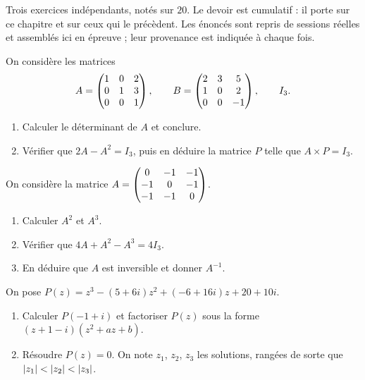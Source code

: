 \begin{devoir}[2 heures]
Trois exercices indépendants, notés sur $20$. Le devoir est cumulatif : il porte sur ce chapitre et sur ceux qui le précèdent. Les énoncés sont repris de sessions réelles et assemblés ici en épreuve ; leur provenance est indiquée à chaque fois.

On considère les matrices
\[
  A = \begin{pmatrix} 1 & 0 & 2 \\ 0 & 1 & 3 \\ 0 & 0 & 1 \end{pmatrix}, \qquad
  B = \begin{pmatrix} 2 & 3 & 5 \\ 1 & 0 & 2 \\ 0 & 0 & -1 \end{pmatrix}, \qquad I_{3}.
\]
\begin{enumerate}[label=\textbf{\arabic*)}, leftmargin=*, itemsep=0.15em]
  \item Calculer le déterminant de $A$ et conclure.
  \item Vérifier que $2A-A^{2} = I_{3}$, puis en déduire la matrice $P$ telle
        que $A \times P = I_{3}$.
\end{enumerate}

On considère la matrice
$A = \begin{pmatrix} 0 & -1 & -1 \\ -1 & 0 & -1 \\ -1 & -1 & 0 \end{pmatrix}$.
\begin{enumerate}[label=\textbf{\arabic*)}, leftmargin=*, itemsep=0.15em]
  \item Calculer $A^{2}$ et $A^{3}$.
  \item Vérifier que $4A+A^{2}-A^{3} = 4I_{3}$.
  \item En déduire que $A$ est inversible et donner $A^{-1}$.
\end{enumerate}

On pose $P(z) = z^{3}-(5+6i)z^{2}+(-6+16i)z+20+10i$.
\begin{enumerate}[label=\textbf{\arabic*)}, leftmargin=*, itemsep=0.15em]
  \item Calculer $P(-1+i)$ et factoriser $P(z)$ sous la forme
        $(z+1-i)\left(z^{2}+az+b\right)$.
  \item Résoudre $P(z) = 0$. On note $z_{1}$, $z_{2}$, $z_{3}$ les solutions,
        rangées de sorte que $\left|z_{1}\right|<\left|z_{2}\right|<\left|z_{3}\right|$.
\end{enumerate}

\end{devoir}

